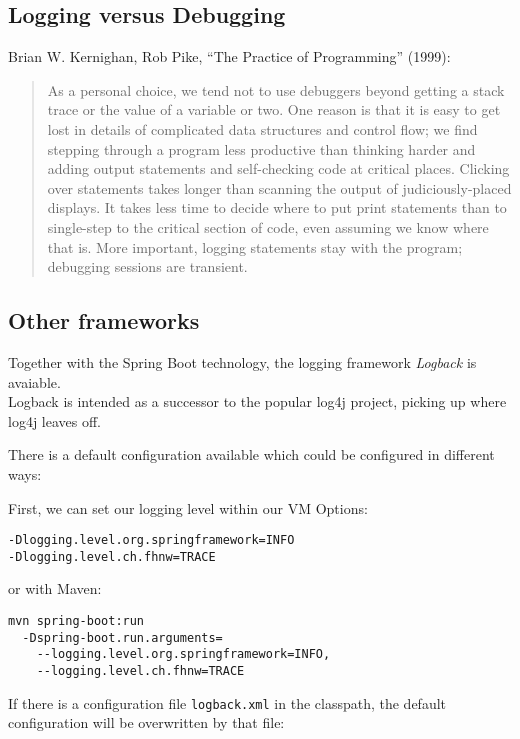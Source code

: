 \subsection{Logging versus Debugging}
Brian W. Kernighan, Rob Pike, ``The Practice of Programming'' (1999):
\begin{quote}
As a personal choice, we tend not to use debuggers beyond getting a stack trace
or the value of a variable or two. One reason is that it is easy to get lost
in details of complicated data structures and control flow; we  find stepping
through a program less productive than thinking harder and adding output
statements and self-checking code at critical places. Clicking over statements
takes longer than scanning the output of judiciously-placed displays. It takes
less time to decide where to put print statements than to single-step to the
critical section of code, even assuming we know where that is. More important,
logging statements stay with the program; debugging sessions are
transient.
\end{quote}
%
\newslide
\subsection{Other frameworks}
Together with the Spring Boot technology, the logging framework \emph{Logback}
is avaiable.\\
Logback is intended as a successor to the popular log4j project,
picking up where log4j leaves off.

\vspace{3mm}

There is a default configuration available which could be configured
in different ways:

First, we can set our logging level within our VM Options:

\begin{lstlisting}
-Dlogging.level.org.springframework=INFO
-Dlogging.level.ch.fhnw=TRACE
\end{lstlisting}

or with Maven:

\begin{lstlisting}
mvn spring-boot:run
  -Dspring-boot.run.arguments=
    --logging.level.org.springframework=INFO,
    --logging.level.ch.fhnw=TRACE
\end{lstlisting}

If there is a configuration file \verb|logback.xml| in the classpath,
the default configuration will be overwritten by that file:

